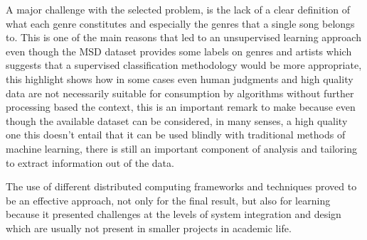\documentclass[10pt,a4paper, twocolumn]{article}
\begin{document}
  A major challenge with the selected problem, is the lack of a clear definition
  of what each genre constitutes and especially the genres that a single song belongs to.
  This is one of the main reasons that led to an unsupervised learning approach even
  though the MSD dataset provides some labels on genres and artists which
  suggests that a supervised classification methodology would be more appropriate, this
  highlight shows how in some cases even human judgments and high
  quality data are not necessarily suitable for consumption by algorithms without
  further processing based the context, this is an important
  remark to make because even though the available dataset can be considered, in many
  senses, a high quality one this doesn't entail that it can be used blindly with
  traditional methods of machine learning, there is still an important component of
  analysis and tailoring to extract information out of the data.
  
  The use of different distributed computing frameworks and techniques proved to be
  an effective approach, not only for the final result, but also for learning
  because it presented challenges at the levels of system integration and design which
  are usually not present in smaller projects in academic life.  
  
  \printbibliography
\end{document}
